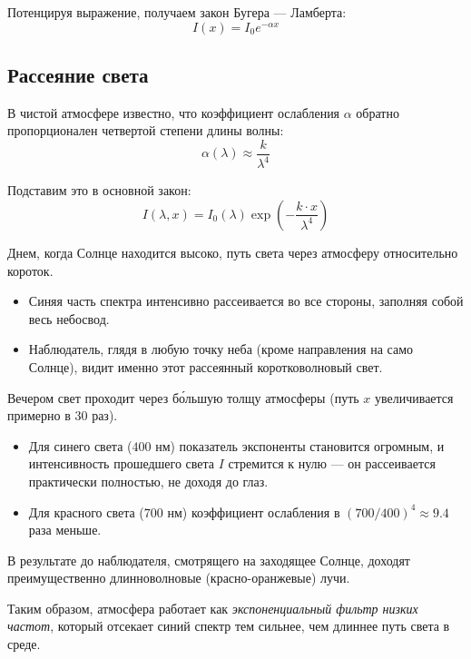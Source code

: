 Потенцируя выражение, получаем закон Бугера --- Ламберта:
\[\boxed{
I(x) = I_0 e^{-\alpha x}
}\]

\subsection{Рассеяние света}

В чистой атмосфере известно, что коэффициент ослабления $\alpha$ обратно пропорционален четвертой степени длины волны:
\[
\alpha(\lambda) \approx \frac{k}{\lambda^4}
\]

Подставим это в основной закон:
\[
I(\lambda, x) = I_0(\lambda) \exp\left( -\frac{k \cdot x}{\lambda^4} \right)
\]

Днем, когда Солнце находится высоко, путь света через атмосферу относительно короток. 
\begin{itemize}
    \item Синяя часть спектра интенсивно рассеивается во все стороны, заполняя собой весь небосвод. 
    \item Наблюдатель, глядя в любую точку неба (кроме направления на само Солнце), видит именно этот рассеянный коротковолновый свет. 
\end{itemize}

Вечером свет проходит через б\'{о}льшую толщу атмосферы (путь $x$ увеличивается примерно в 30 раз). 
\begin{itemize}
    \item Для синего света ($400$ нм) показатель экспоненты становится огромным, и интенсивность прошедшего света $I$ стремится к нулю --- он рассеивается практически полностью, не доходя до глаз. 
    \item Для красного света ($700$ нм) коэффициент ослабления в $(700/400)^4 \approx 9.4$ раза меньше. 
\end{itemize}
В результате до наблюдателя, смотрящего на заходящее Солнце, доходят преимущественно длинноволновые (красно-оранжевые) лучи. 

Таким образом, атмосфера работает как \textit{экспоненциальный фильтр низких частот}, который отсекает синий спектр тем сильнее, чем длиннее путь света в среде. 